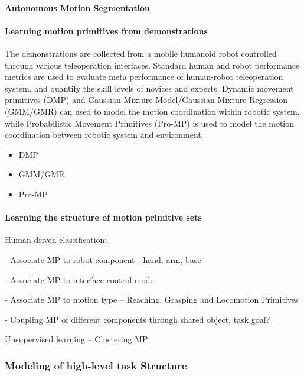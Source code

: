 \paragraph*{Autonomous Motion Segmentation}



\paragraph*{Learning motion primitives from demonstrations}
The demonstrations are collected from a mobile humanoid robot controlled through various teleoperation interfaces. Standard human and robot performance metrics are used to evaluate meta performance of human-robot teleoperation system, and quantify the skill levels of novices and experts. Dynamic movement primitives (DMP) and Gaussian Mixture Model/Gaussian Mixture Regression (GMM/GMR) can used to model the motion coordination within robotic system, while Probabilistic Movement Primitives (Pro-MP) is used to model the motion coordination between robotic system and environment.

\begin{itemize}
    \item DMP
    
    \item GMM/GMR
    
    \item Pro-MP
    
\end{itemize}

\paragraph*{Learning the structure of motion primitive sets}

Human-driven classification: 

- Associate MP to robot component - hand, arm, base

- Associate MP to interface control mode

- Associate MP to motion type -- Reaching, Grasping and Locomotion Primitives

- Coupling MP of different components through shared object, task goal? 

Unsupervised learning -- Clustering MP

\subsubsection{Modeling of high-level task Structure}\label{sec:plan-modeling-Plan}


